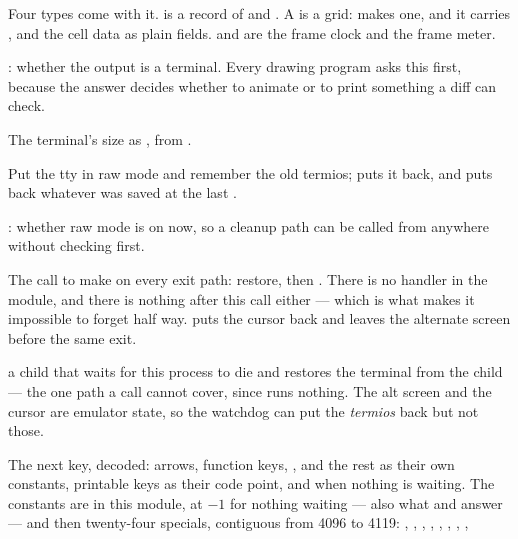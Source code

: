 Four types come with it.  is a record of  and . A
 is a grid:  makes one, and it carries ,
 and the cell data as plain fields.  and  are the
frame clock and the frame meter.

\begin{description}[style=nextline,leftmargin=5.2em]
\item[\ic{tui.is\_tty(fd)}] : whether the output is a terminal. Every
  drawing program asks this first, because the answer decides whether to animate
  or to print something a diff can check.
\item[\ic{tui.size()}] The terminal's size as , from
  .
\item[\ic{tui.raw\_mode()}] Put the tty in raw mode and remember the old
  termios;  puts it back, and  puts back whatever
  was saved at the last .
\item[\ic{tui.active()}] : whether raw mode is on now, so a cleanup path
  can be called from anywhere without checking first.
\item[\ic{tui.restore\_exit(code)},
  \ic{tui.restore\_all\_exit(code)}] The call to make on every exit path:
  restore, then . There is no  handler in the
  module, and there is nothing after this call either --- which is what makes it
  impossible to forget half way.  puts the
  cursor back and leaves the alternate screen before the same exit.
\item[\ic{tui.arm\_watchdog()}]  a child that waits for this process to
  die and restores the terminal from the child --- the one path a call cannot
  cover, since  runs nothing. The alt screen and the cursor are
  emulator state, so the watchdog can put the \emph{termios} back but not those.
\item[\ic{tui.read\_key()}] The next key, decoded: arrows, function keys,
  ,  and the rest as their own constants, printable keys as
  their code point, and  when nothing is waiting.
  The constants are in this module,  at $-1$ for nothing
  waiting --- also what  and  answer --- and
  then twenty-four specials, contiguous from 4096 to 4119:
  , , , ,
  , , , ,

\end{description}
